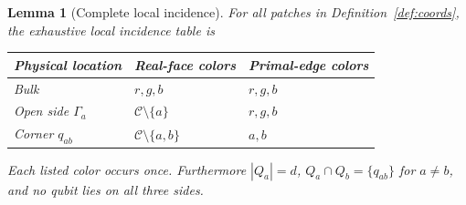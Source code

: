 \documentclass[11pt]{article}
\theoremstyle{definition}
\theoremstyle{plain}
\newtheorem{lemma}[definition]{Lemma}
\theoremstyle{remark}
\newcommand{\C}{\mathcal C}
\begin{document}
\begin{lemma}[Complete local incidence]\label{lem:incidence}
For all patches in Definition~\ref{def:coords}, the exhaustive local
incidence table is
\begin{center}
\begin{tabular}{@{}lll@{}}
\toprule
Physical location & Real-face colors & Primal-edge colors\\
\midrule
Bulk & $r,g,b$ & $r,g,b$\\
Open side $\Gamma_a$ & $\C\setminus\{a\}$ & $r,g,b$\\
Corner $q_{ab}$ & $\C\setminus\{a,b\}$ & $a,b$\\
\bottomrule
\end{tabular}
\end{center}
Each listed color occurs once. Furthermore $|Q_a|=d$,
$Q_a\cap Q_b=\{q_{ab}\}$ for $a\ne b$, and no qubit lies on all three sides.
\end{lemma}
\end{document}
